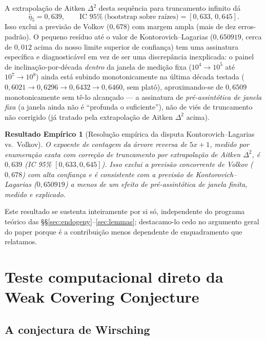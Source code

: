 \documentclass[11pt]{article}
\newtheorem{empirical}[theorem]{Resultado Empírico}
\theoremstyle{definition}
\theoremstyle{remark}
\begin{document}
A extrapolação de Aitken $\Delta^2$ desta sequência para truncamento
infinito dá
\begin{equation}\label{eq:kl-result}
  \hat\eta_5 = 0{,}639, \qquad \text{IC } 95\%\ \text{(bootstrap sobre
  raízes)} = [0{,}633,\, 0{,}645].
\end{equation}
Isso exclui a previsão de Volkov ($0{,}678$) com margem ampla (mais de
dez erros-padrão). O pequeno resíduo até o valor de
Kontorovich--Lagarias ($0{,}650919$, cerca de $0{,}012$ acima do nosso
limite superior de confiança) tem uma assinatura específica e
diagnosticável em vez de ser uma discrepância inexplicada: o painel de
inclinação-por-década \emph{dentro} da janela de medição fixa
($10^4\!\to\!10^5$ até $10^7\!\to\!10^8$) ainda está subindo
monotonicamente na última década testada
($0{,}6021\to0{,}6296\to0{,}6432\to0{,}6460$, sem platô), aproximando-se
de $0{,}6509$ monotonicamente sem tê-lo alcançado --- a assinatura de
\emph{pré-assintótica de janela fixa} (a janela ainda não é
``profunda o suficiente''), não de viés de truncamento não corrigido
(já tratado pela extrapolação de Aitken $\Delta^2$ acima).

\begin{empirical}[Resolução empírica da disputa Kontorovich--Lagarias
vs.\ Volkov]\label{thm:kl}
O expoente de contagem da árvore reversa de $5x+1$, medido por
enumeração exata com correção de truncamento por extrapolação de
Aitken $\Delta^2$, é $0{,}639$ (IC 95\% $[0{,}633,0{,}645]$). Isso exclui a
previsão concorrente de Volkov ($0{,}678$) com alta confiança e é
consistente com a previsão de Kontorovich--Lagarias ($0{,}650919$) a
menos de um efeito de pré-assintótica de janela finita, medido e
explicado.
\end{empirical}

Este resultado se sustenta inteiramente por si só, independente do
programa teórico das \S\S\ref{sec:endogeny}--\ref{sec:lemmas};
destacamo-lo cedo no argumento geral do paper porque é a contribuição
menos dependente de enquadramento que relatamos.

\section{Teste computacional direto da Weak Covering Conjecture}
\label{sec:wcc}

\subsection{A conjectura de Wirsching}
\end{document}
